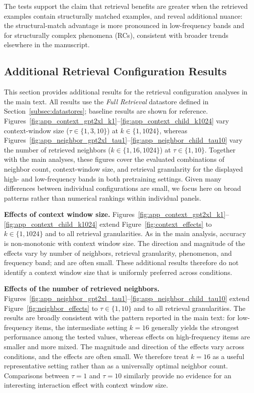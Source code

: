 \noindent The tests support the claim that retrieval benefits are greater when the retrieved examples contain structurally matched examples, and reveal additional nuance: the structural-match advantage is more pronounced in low-frequency bands and for structurally complex phenomena (RCs), consistent with broader trends elsewhere in the manuscript.


\subsection{Additional Retrieval Configuration Results}
\label{app:retrieval_config}

This section provides additional results for the retrieval configuration analyses in the main text. All results use the \textit{Full Retrieval} datastore defined in Section~\ref{subsec:datastores}; baseline results are shown for reference. Figures~\ref{fig:app_context_gpt2xl_k1}--\ref{fig:app_context_child_k1024} vary context-window size ($\tau \in \{1, 3, 10\}$) at $k \in \{1, 1024\}$, whereas Figures~\ref{fig:app_neighbor_gpt2xl_tau1}--\ref{fig:app_neighbor_child_tau10} vary the number of retrieved neighbors ($k \in \{1, 16, 1024\}$) at $\tau \in \{1, 10\}$. Together with the main analyses, these figures cover the evaluated combinations of neighbor count, context-window size, and retrieval granularity for the displayed high- and low-frequency bands in both pretraining settings. Given many differences between individual configurations are small, we focus here on broad patterns rather than numerical rankings within individual panels.

\noindent \textbf{Effects of context window size.}
Figures~\ref{fig:app_context_gpt2xl_k1}--\ref{fig:app_context_child_k1024} extend Figure~\ref{fig:context_effects} to $k \in \{1, 1024\}$ and to all retrieval granularities. As in the main analysis, accuracy is non-monotonic with context window size. The direction and magnitude of the effects vary by number of neighbors, retrieval granularity, phenomenon, and frequency band; and are often small. These additional results therefore do not identify a context window size that is uniformly preferred across conditions.


\noindent \textbf{Effects of the number of retrieved neighbors.}
Figures~\ref{fig:app_neighbor_gpt2xl_tau1}--\ref{fig:app_neighbor_child_tau10} extend Figure~\ref{fig:neighbor_effects} to $\tau \in \{1, 10\}$ and to all retrieval granularities. The results are broadly consistent with the pattern reported in the main text: for low-frequency items, the intermediate setting $k=16$ generally yields the strongest performance among the tested values, whereas effects on high-frequency items are smaller and more mixed. The magnitude and direction of the effects vary across conditions, and the effects are often small. We therefore treat $k=16$ as a useful representative setting rather than as a universally optimal neighbor count. Comparisons between $\tau=1$ and $\tau=10$ similarly provide no evidence for an interesting interaction effect with context window size.




